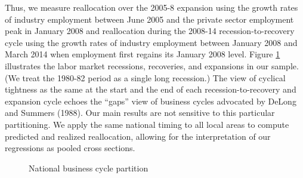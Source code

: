 \documentclass[12pt]{article}
\newcommand{\highlightPP}[1]{{\emph{\color{MyPurple}{#1}}}}
\theoremstyle{definition}
\begin{document}
\highlightPP{We define a national labor market recession as the period between a private sector employment peak and the employment trough, a recovery as the period from the trough until the economy regains its previous peak level, and an expansion as the period between the end of a recovery and the start of the next recession.} Thus, we measure reallocation over the 2005-8 expansion using the growth rates of industry employment between June 2005 and the private sector employment peak in January 2008 and reallocation during the 2008-14 recession-to-recovery cycle using the growth rates of industry employment between January 2008 and March 2014 when employment first regains its January 2008 level. Figure \ref{chodorow-reichSecularLaborReallocation2020_fig1} illustrates the labor market recessions, recoveries, and expansions in our sample. (We treat the 1980-82 period as a single long recession.) The view of cyclical tightness as the same at the start and the end of each recession-to-recovery and expansion cycle echoes the ``gaps'' view of business cycles advocated by DeLong and Summers (1988). Our main results are not sensitive to this particular partitioning. We apply the same national timing to all local areas to compute predicted and realized reallocation, allowing for the interpretation of our regressions as pooled cross sections.

\begin{figure}[H]
    \noindent\caption{National business cycle partition}
    \begin{center}
        \label{chodorow-reichSecularLaborReallocation2020_fig1}
    \end{center}
\end{figure}
\end{document}
